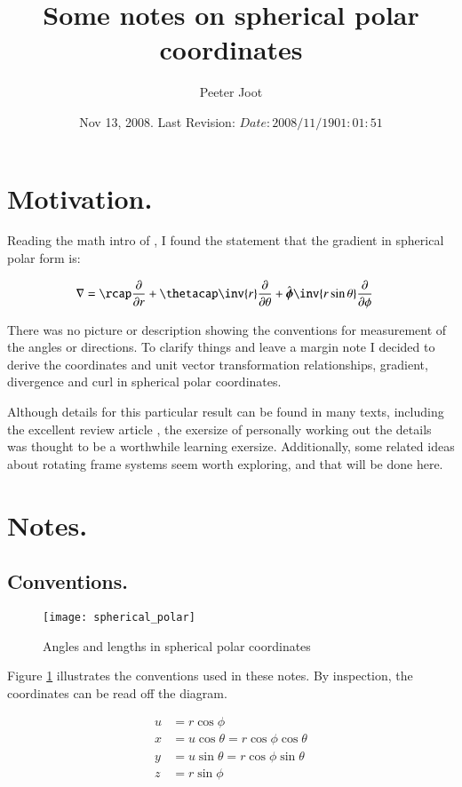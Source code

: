 \documentclass{article}
\title{Some notes on spherical polar coordinates}
\author{Peeter Joot}
\date{ Nov 13, 2008.  Last Revision: $Date: 2008/11/19 01:01:51 $ }
\newcommand{\phicap}[0]{\hat{\boldsymbol{\phi}}}
\begin{document}
\maketitle{}
\tableofcontents

\section{ Motivation. }

Reading the math intro of \cite{zeilik1998iaa}, I found the statement that the gradient in spherical polar form is:

\begin{align*}
\grad &= 
\rcap \PD{r}{}
+\thetacap \inv{r} \PD{\theta}{}
+\phicap \inv{r \sin\theta}\PD{\phi}{}
\end{align*}

There was no picture or description showing the conventions for measurement of the angles or directions.
To clarify things and leave a margin note I decided to derive the coordinates and unit vector transformation relationships,
gradient, divergence and curl in spherical polar coordinates.

Although details for this particular result can be found in many texts,
including the excellent review article \cite{fleischCoords}, the 
exersize of personally working out the details was thought to be
a worthwhile
learning exersize.  Additionally, some related ideas about rotating
frame systems seem worth exploring, and that will be done here.

\section{ Notes. }
\subsection{ Conventions. }

\begin{figure}[htp]
\centering
\texttt{[image: spherical\_polar]}
\caption{Angles and lengths in spherical polar coordinates}\label{fig:spherical_polar}
\end{figure}

Figure \ref{fig:spherical_polar} illustrates the conventions used in 
these notes.  By inspection, the coordinates can be read off the diagram.

\begin{align}\label{eqn:coordinates}
u &= r \cos\phi \\
x &= u \cos\theta = r \cos\phi \cos\theta \\
y &= u \sin\theta = r \cos\phi \sin\theta \\
z &= r \sin\phi
\end{align}
\end{document}
